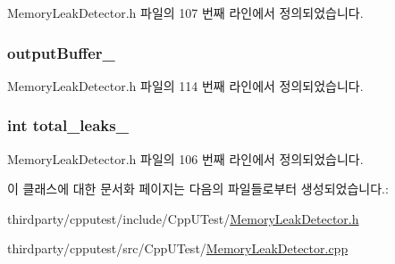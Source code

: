 Memory\+Leak\+Detector.\+h 파일의 107 번째 라인에서 정의되었습니다.

\subsubsection[{\texorpdfstring{output\+Buffer\+\_\+}{outputBuffer_}}]{ output\+Buffer\+\_\+\hspace{0.3cm}{\ttfamily [private]}}\hypertarget{class_memory_leak_output_string_buffer_aba62884e35f3c42b627faf57b0e80a8c}{}\label{class_memory_leak_output_string_buffer_aba62884e35f3c42b627faf57b0e80a8c}


Memory\+Leak\+Detector.\+h 파일의 114 번째 라인에서 정의되었습니다.

\subsubsection[{\texorpdfstring{total\+\_\+leaks\+\_\+}{total_leaks_}}]{\setlength{\rightskip}{0pt plus 5cm}int total\+\_\+leaks\+\_\+\hspace{0.3cm}{\ttfamily [private]}}\hypertarget{class_memory_leak_output_string_buffer_aba01adde02a49ff2d2334a1bc63d3efd}{}\label{class_memory_leak_output_string_buffer_aba01adde02a49ff2d2334a1bc63d3efd}


Memory\+Leak\+Detector.\+h 파일의 106 번째 라인에서 정의되었습니다.



이 클래스에 대한 문서화 페이지는 다음의 파일들로부터 생성되었습니다.\+:\begin{DoxyCompactItemize}
\item 
thirdparty/cpputest/include/\+Cpp\+U\+Test/\hyperlink{_memory_leak_detector_8h}{Memory\+Leak\+Detector.\+h}\item 
thirdparty/cpputest/src/\+Cpp\+U\+Test/\hyperlink{_memory_leak_detector_8cpp}{Memory\+Leak\+Detector.\+cpp}\end{DoxyCompactItemize}
